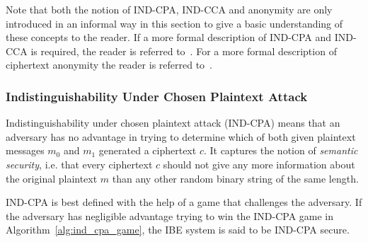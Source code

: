 Note that both the notion of IND-CPA, IND-CCA and anonymity are only introduced in an informal way in this section to give a basic understanding of these concepts to the reader. If a more formal description of IND-CPA and IND-CCA is required, the reader is referred to~\cite{art:BonehF01}. For a more formal description of ciphertext anonymity the reader is referred to~\cite{art:AbdallaBCKKLMNPS05}.

\subsubsection{Indistinguishability Under Chosen Plaintext Attack}
Indistinguishability under chosen plaintext attack (IND-CPA) means that an adversary has no advantage in trying to determine which of both given plaintext messages $m_0$ and $m_1$ generated a ciphertext $c$. It captures the notion of \textit{semantic security}, i.e. that every ciphertext $c$ should not give any more information about the original plaintext $m$ than any other random binary string of the same length.

IND-CPA is best defined with the help of a game that challenges the adversary. If the adversary has negligible advantage trying to win the IND-CPA game in Algorithm~\ref{alg:ind_cpa_game}, the IBE system is said to be IND-CPA secure.


